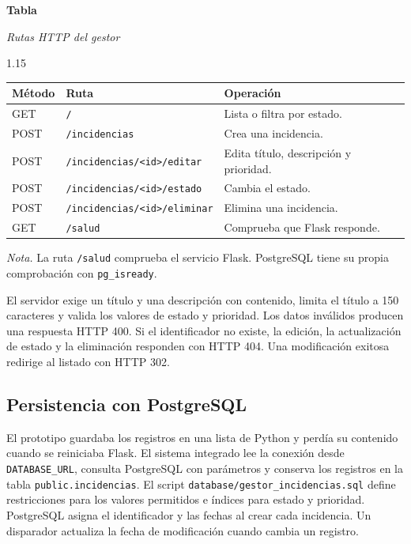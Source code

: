 \documentclass[12pt,letterpaper]{article}
\newcommand{\notafigura}[1]{\par\noindent\textit{Nota.} #1\par}
\begin{document}
\par\medskip\noindent
\begin{minipage}{\textwidth}
  \label{tab:rutas}
  \noindent\textbf{Tabla \thetable}\par
  \noindent\textit{Rutas HTTP del gestor}\par
  \begin{spacing}{1.15}
  \noindent\begin{tabularx}{\linewidth}{@{} l >{\raggedright\arraybackslash}p{2.48in} >{\raggedright\arraybackslash}X @{}}
    \toprule
    \textbf{Método} & \textbf{Ruta} & \textbf{Operación} \\
    \midrule
    GET & \texttt{/} & Lista o filtra por estado. \\
    POST & \texttt{/incidencias} & Crea una incidencia. \\
    POST & \texttt{/incidencias/<id>/editar} & Edita título, descripción y prioridad. \\
    POST & \texttt{/incidencias/<id>/estado} & Cambia el estado. \\
    POST & \texttt{/incidencias/<id>/eliminar} & Elimina una incidencia. \\
    GET & \texttt{/salud} & Comprueba que Flask responde. \\
    \bottomrule
  \end{tabularx}
  \end{spacing}
  \notafigura{La ruta \texttt{/salud} comprueba el servicio Flask. PostgreSQL tiene su propia comprobación con \texttt{pg\_isready}.}
\end{minipage}\par\medskip

El servidor exige un título y una descripción con contenido, limita el título a 150 caracteres y valida los valores de estado y prioridad. Los datos inválidos producen una respuesta HTTP 400. Si el identificador no existe, la edición, la actualización de estado y la eliminación responden con HTTP 404. Una modificación exitosa redirige al listado con HTTP 302.

\subsection{Persistencia con PostgreSQL}

El prototipo guardaba los registros en una lista de Python y perdía su contenido cuando se reiniciaba Flask. El sistema integrado lee la conexión desde \texttt{DATABASE\_URL}, consulta PostgreSQL con parámetros y conserva los registros en la tabla \texttt{public.incidencias}. El script \texttt{database/gestor\_incidencias.sql} define restricciones para los valores permitidos e índices para estado y prioridad. PostgreSQL asigna el identificador y las fechas al crear cada incidencia. Un disparador actualiza la fecha de modificación cuando cambia un registro.
\end{document}
